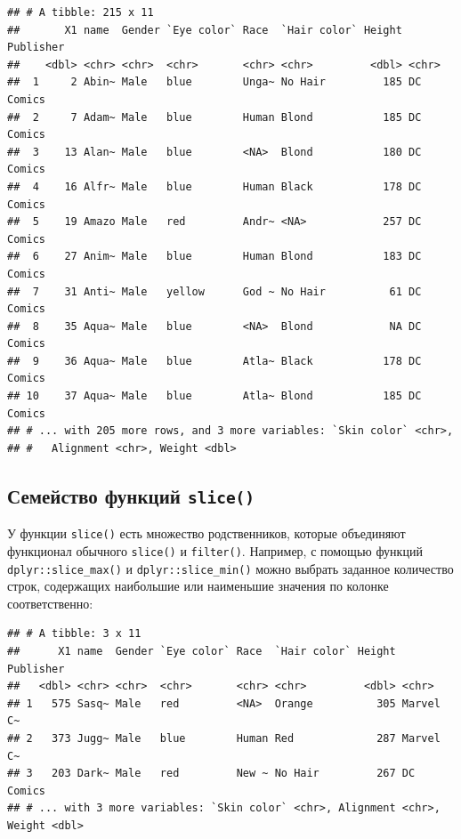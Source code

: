 \documentclass[
]{book}
\newenvironment{Shaded}{\begin{snugshade}}{\end{snugshade}}
\newcommand{\DataTypeTok}[1]{\textcolor[rgb]{0.13,0.29,0.53}{#1}}
\newcommand{\DecValTok}[1]{\textcolor[rgb]{0.00,0.00,0.81}{#1}}
\newcommand{\KeywordTok}[1]{\textcolor[rgb]{0.13,0.29,0.53}{\textbf{#1}}}
\newcommand{\NormalTok}[1]{#1}
\newcommand{\OperatorTok}[1]{\textcolor[rgb]{0.81,0.36,0.00}{\textbf{#1}}}
\newcommand{\StringTok}[1]{\textcolor[rgb]{0.31,0.60,0.02}{#1}}
\begin{document}
\begin{verbatim}
## # A tibble: 215 x 11
##       X1 name  Gender `Eye color` Race  `Hair color` Height Publisher
##    <dbl> <chr> <chr>  <chr>       <chr> <chr>         <dbl> <chr>    
##  1     2 Abin~ Male   blue        Unga~ No Hair         185 DC Comics
##  2     7 Adam~ Male   blue        Human Blond           185 DC Comics
##  3    13 Alan~ Male   blue        <NA>  Blond           180 DC Comics
##  4    16 Alfr~ Male   blue        Human Black           178 DC Comics
##  5    19 Amazo Male   red         Andr~ <NA>            257 DC Comics
##  6    27 Anim~ Male   blue        Human Blond           183 DC Comics
##  7    31 Anti~ Male   yellow      God ~ No Hair          61 DC Comics
##  8    35 Aqua~ Male   blue        <NA>  Blond            NA DC Comics
##  9    36 Aqua~ Male   blue        Atla~ Black           178 DC Comics
## 10    37 Aqua~ Male   blue        Atla~ Blond           185 DC Comics
## # ... with 205 more rows, and 3 more variables: `Skin color` <chr>,
## #   Alignment <chr>, Weight <dbl>
\end{verbatim}

\hypertarget{slice_family}{%
\subsection{\texorpdfstring{Семейство функций \texttt{slice()}}{Семейство функций slice()}}\label{slice_family}}

У функции \texttt{slice()} есть множество родственников, которые объединяют функционал обычного \texttt{slice()} и \texttt{filter()}. Например, с помощью функций \texttt{dplyr::slice\_max()} и \texttt{dplyr::slice\_min()} можно выбрать заданное количество строк, содержащих наибольшие или наименьшие значения по колонке соответственно:

\begin{Shaded}
\end{Shaded}

\begin{verbatim}
## # A tibble: 3 x 11
##      X1 name  Gender `Eye color` Race  `Hair color` Height Publisher
##   <dbl> <chr> <chr>  <chr>       <chr> <chr>         <dbl> <chr>    
## 1   575 Sasq~ Male   red         <NA>  Orange          305 Marvel C~
## 2   373 Jugg~ Male   blue        Human Red             287 Marvel C~
## 3   203 Dark~ Male   red         New ~ No Hair         267 DC Comics
## # ... with 3 more variables: `Skin color` <chr>, Alignment <chr>, Weight <dbl>
\end{verbatim}
\end{document}
